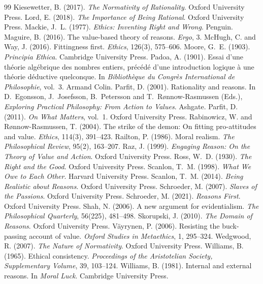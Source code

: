 \documentclass{situationist-preprint}
\begin{document}
\begin{thebibliography}{99}
 Kiesewetter, B. (2017). \emph{The Normativity of Rationality}. Oxford University Press.
 Lord, E. (2018). \emph{The Importance of Being Rational}. Oxford University Press.
 Mackie, J.~L. (1977). \emph{Ethics: Inventing Right and Wrong}. Penguin.
 Maguire, B. (2016). The value-based theory of reasons. \emph{Ergo}, 3.
 McHugh, C. and Way, J. (2016). Fittingness first. \emph{Ethics}, 126(3), 575--606.
 Moore, G.~E. (1903). \emph{Principia Ethica}. Cambridge University Press.
 Padoa, A. (1901). Essai d'une th\'eorie alg\'ebrique des nombres entiers, pr\'ec\'ed\'e d'une introduction logique \`a une th\'eorie d\'eductive quelconque. In \emph{Biblioth\`eque du Congr\`es International de Philosophie}, vol.~3. Armand Colin.
 Parfit, D. (2001). Rationality and reasons. In D.~Egonsson, J.~Josefsson, B.~Petersson and T.~R{\o}nnow-Rasmussen (Eds.), \emph{Exploring Practical Philosophy: From Action to Values}. Ashgate.
 Parfit, D. (2011). \emph{On What Matters}, vol.~1. Oxford University Press.
 Rabinowicz, W. and R{\o}nnow-Rasmussen, T. (2004). The strike of the demon: On fitting pro-attitudes and value. \emph{Ethics}, 114(3), 391--423.
 Railton, P. (1986). Moral realism. \emph{The Philosophical Review}, 95(2), 163--207.
 Raz, J. (1999). \emph{Engaging Reason: On the Theory of Value and Action}. Oxford University Press.
 Ross, W.~D. (1930). \emph{The Right and the Good}. Oxford University Press.
 Scanlon, T.~M. (1998). \emph{What We Owe to Each Other}. Harvard University Press.
 Scanlon, T.~M. (2014). \emph{Being Realistic about Reasons}. Oxford University Press.
 Schroeder, M. (2007). \emph{Slaves of the Passions}. Oxford University Press.
 Schroeder, M. (2021). \emph{Reasons First}. Oxford University Press.
 Shah, N. (2006). A new argument for evidentialism. \emph{The Philosophical Quarterly}, 56(225), 481--498.
 Skorupski, J. (2010). \emph{The Domain of Reasons}. Oxford University Press.
 V{\"a}yrynen, P. (2006). Resisting the buck-passing account of value. \emph{Oxford Studies in Metaethics}, 1, 295--324.
 Wedgwood, R. (2007). \emph{The Nature of Normativity}. Oxford University Press.
 Williams, B. (1965). Ethical consistency. \emph{Proceedings of the Aristotelian Society, Supplementary Volume}, 39, 103--124.
 Williams, B. (1981). Internal and external reasons. In \emph{Moral Luck}. Cambridge University Press.
\end{thebibliography}
\end{document}
